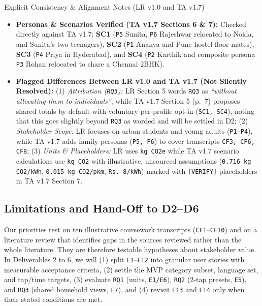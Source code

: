 \documentclass[12pt, a4paper]{article}
\begin{document}
\begin{checkcard}{Explicit Consistency \& Alignment Notes (LR v1.0 and TA v1.7)}
\footnotesize
\begin{itemize}
    \item \textbf{Personas \& Scenarios Verified (TA v1.7 Sections 6 \& 7):} Checked directly against TA v1.7: \textbf{SC1} (\texttt{P5} Sunita, \texttt{P6} Rajeshwar relocated to Noida, and Sunita's two teenagers), \textbf{SC2} (\texttt{P1} Ananya and Pune hostel floor-mates), \textbf{SC3} (\texttt{P4} Priya in Hyderabad), and \textbf{SC4} (\texttt{P2} Karthik and composite persona \texttt{P3} Rohan relocated to share a Chennai 2BHK).
    \item \textbf{Flagged Differences Between LR v1.0 and TA v1.7 (Not Silently Resolved):} (1) \textit{Attribution (\texttt{RQ3}):} LR Section 5 words \texttt{RQ3} as \textit{``without allocating them to individuals''}, while TA v1.7 Section 5 (p.\ 7) proposes shared totals by default with voluntary per-profile opt-in (\texttt{SC1, SC4}), noting that this goes slightly beyond \texttt{RQ3} as worded and will be settled in D2; (2) \textit{Stakeholder Scope:} LR focuses on urban students and young adults (\texttt{P1--P4}), while TA v1.7 adds family personas (\texttt{P5, P6}) to cover transcripts \texttt{CF3, CF6, CF8}; (3) \textit{Units \& Placeholders:} LR uses \texttt{kg CO2e} while TA v1.7 scenario calculations use \texttt{kg CO2} with illustrative, unsourced assumptions (\texttt{0.716 kg CO2/kWh}, \texttt{0.015 kg CO2/pkm}, \texttt{Rs.\ 8/kWh}) marked with \texttt{[VERIFY]} placeholders in TA v1.7 Section 7.
\end{itemize}
\end{checkcard}

\subsection{Limitations and Hand-Off to D2--D6}
Our priorities rest on ten illustrative coursework transcripts (\texttt{CF1}--\texttt{CF10}) \cite{cf1,cf10} and on a literature review that identifies gaps in the sources reviewed rather than the whole literature. They are therefore testable hypotheses about stakeholder value. In Deliverables 2 to 6, we will (1) split \texttt{E1}--\texttt{E12} into granular user stories with measurable acceptance criteria, (2) settle the MVP category subset, language set, and tap/time targets, (3) evaluate \texttt{RQ1} (units, \texttt{E1/E6}), \texttt{RQ2} (2-tap presets, \texttt{E5}), and \texttt{RQ3} (shared household views, \texttt{E7}), and (4) revisit \texttt{E13} and \texttt{E14} only when their stated conditions are met.
\end{document}
